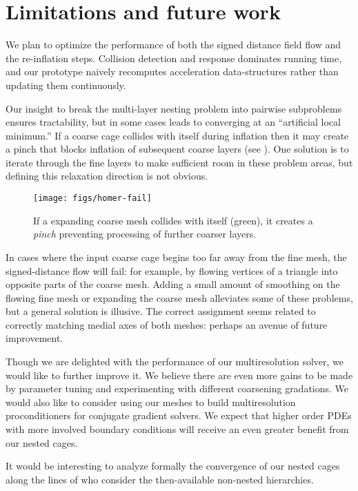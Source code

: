 \section{Limitations and future work}
\label{sec:conclusion}
%
We plan to optimize the performance of both the signed distance field flow and
the re-inflation steps.
%
Collision detection and response dominates running time, and our prototype
naively recomputes acceleration data-structures rather than updating them
continuously.

Our insight to break the multi-layer nesting problem into pairwise subproblems
ensures tractability, but in some cases leads to converging at an
``artificial local minimum.'' If a coarse cage collides with itself during
inflation then it may create a pinch that blocks inflation of subsequent coarse
layers (see ).
%
One solution is to iterate through the fine layers to make sufficient room in
these problem areas, but defining this relaxation direction is not obvious.

\begin{figure}
  \texttt{[image: figs/homer-fail]}
  \caption{If a expanding coarse mesh collides with itself (green), it creates
  a \emph{pinch} preventing processing of further coarser layers.}
  \label{fig:homer}
\end{figure}

In cases where the input coarse cage begins too far away from the fine mesh,
the signed-distance flow will fail: for example, by flowing vertices of a
triangle into opposite parts of the coarse mesh. 
%
Adding a small amount of smoothing on the flowing fine mesh or expanding the
coarse mesh alleviates some of these problems, but a general solution is
illusive.
%
The correct assignment seems related to correctly matching medial axes of both
meshes: perhaps an avenue of future improvement.

Though we are delighted with the performance of our multiresolution solver, 
we would like to further improve it. We believe there are even more gains to be
made by parameter tuning and experimenting with different coarsening
gradations. We would also like to consider using our meshes to build
multiresolution proconditioners for conjugate gradient solvers.
%
We expect that higher order PDEs with more involved boundary conditions will
receive an even greater benefit from our nested cages.

It would be interesting to analyze formally the convergence of our nested cages
along the lines of \cite{chan1996convergence} who consider the then-available
non-nested hierarchies.

